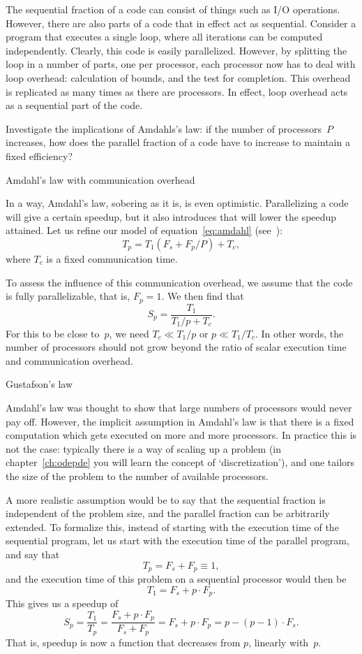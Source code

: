 The sequential fraction of a code can consist of things such as I/O
operations. However, there are also parts of a code that in effect act
as sequential. Consider a program that executes a single loop, where
all iterations can be computed independently. Clearly, this code is
easily parallelized. However, by splitting the loop in a number of
parts, one per processor, each processor now has to deal with loop
overhead: calculation of bounds, and the test for completion. This
overhead is replicated as many times as there are processors. In
effect, loop overhead acts as a sequential part of the code.

\begin{exercise}
  Investigate the implications of Amdahls's law: if the number of
  processors~$P$ increases, how does the parallel fraction of a code
  have to increase to maintain a fixed efficiency?
\end{exercise}


 {Amdahl's law with communication overhead}

In a way, Amdahl's law, sobering as it is, is even optimistic.
Parallelizing a code will give a certain speedup, but it also
introduces  that will lower the
speedup attained. Let us refine our model of
equation~\eqref{eq:amdahl} (see~\cite[p.~367]{Landau:comp-phys}):
\[ T_p= T_1(F_s+F_p/P) +T_c, \]
where $T_c$ is a fixed communication time.

To assess the influence of this communication overhead, we assume that
the code is fully parallelizable, that is, $F_p=1$. We then find that
\[ S_p=\frac{T_1}{T_1/p+T_c}. \]
For this to be close to~$p$, we need $T_c\ll T_1/p$ or $p\ll
T_1/T_c$. In other words, the number of processors should not grow
beyond the ratio of scalar execution time and communication overhead.

 {Gustafson's law}

Amdahl's law was thought to show that large numbers of processors
would never pay off. However, the implicit assumption in Amdahl's law
is that there is a fixed computation which gets executed on more and
more processors. In practice this is not the case: typically there is
a way of scaling up a problem (in chapter~\ref{ch:odepde} you will
learn the concept of `discretization'), and one
tailors the size of the problem to the number of available processors.

A more realistic assumption would be to say that the sequential
fraction is independent of the problem size, and the parallel fraction
can be arbitrarily extended.  To formalize this, instead of starting
with the execution time of the sequential program, let us start with
the execution time of the parallel program, and say that
\[ T_p=F_s+F_p\equiv 1, \]
and the execution time of this problem on a sequential processor would
then be \[ T_1=F_s+p\cdot F_p. \]
This gives us a speedup of
\[ S_p=\frac{T_1}{T_p}=\frac{F_s+p\cdot F_p}{F_s+F_p}
   = F_s+p\cdot F_p = p-(p-1)\cdot F_s. 
\]
That is, speedup is now a function that decreases from $p$, linearly
with~$p$.

